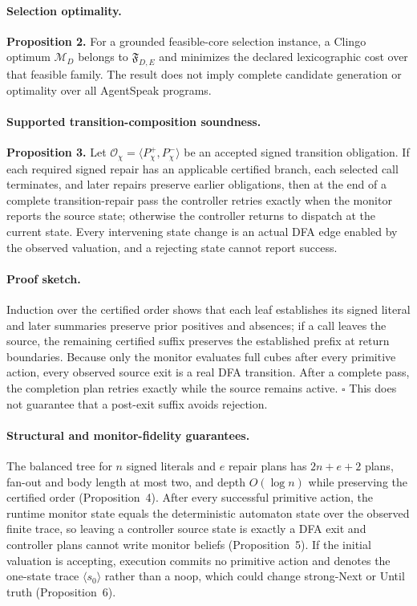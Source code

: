 \paragraph{Selection optimality.}

\textbf{Proposition 2.} For a grounded feasible-core selection instance, a
Clingo optimum $\mathcal M_D$ belongs to $\mathfrak F_{D,E}$ and minimizes the
declared lexicographic cost over that feasible family. The result does not imply
complete candidate generation or optimality over all AgentSpeak programs.

\paragraph{Supported transition-composition soundness.}

\textbf{Proposition 3.} Let $\mathcal O_\chi=\langle
P_\chi^+,P_\chi^-\rangle$ be an accepted signed transition obligation. If each
required signed repair has an applicable certified branch,
each selected call terminates, and later repairs preserve earlier obligations,
then at the end of a complete transition-repair pass the controller retries
exactly when the monitor reports the source state; otherwise the controller returns to
dispatch at the
current state. Every intervening state change is an actual DFA edge enabled by
the observed valuation, and a rejecting state cannot report success.

\paragraph{Proof sketch.}
Induction over the certified order shows that each leaf
establishes its signed literal and later summaries preserve prior positives and
absences; if a call leaves the source, the remaining certified suffix preserves
the established prefix at return boundaries. Because only the monitor evaluates full cubes
after every primitive action, every observed source exit is a real DFA
transition. After a complete pass, the completion plan retries exactly while the source
remains active. \hfill$\square$ This does not guarantee that a post-exit suffix
avoids rejection.

\paragraph{Structural and monitor-fidelity guarantees.}
The balanced tree for $n$ signed literals and $e$ repair plans has
$2n+e+2$ plans, fan-out and body length at most two, and depth $O(\log n)$
while preserving the certified order (Proposition~4). After every successful
primitive action, the runtime monitor state equals the deterministic automaton
state over the observed finite trace, so leaving a controller source state is
exactly a DFA exit and controller plans cannot write monitor beliefs
(Proposition~5). If the initial valuation is accepting, execution
commits no primitive action and denotes the one-state trace
$\langle s_0\rangle$ rather than a noop, which could change
strong-Next or Until truth (Proposition~6).
